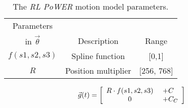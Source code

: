 \begin{table}[h]
\begin{center}
\begin{tabular}{|c|c|c|}
\hline
Parameters        &                           &       \\
in $\vec{\theta}$ & Description               & Range \\
\hline
\hline
$f(s1,s2,s3)$        & Spline function           & [0,1] \\  %
\hline
$R$          & Position multiplier                & [256, 768] \\
\hline
\end{tabular}
\caption{The \emph{RL PoWER} motion model parameters.}
\end{center}
\end{table}


\[
\vec{g}(t) =
\left[ {\begin{array}{c@{ }c@{ }c@{ }l@{ }l}
R \cdot f(s1, s2, s3) & \ \          & \             & \            & + C \\ %
0                              & \             & \             & \            & + C_C \\ %
\end{array} } \right]
\]

